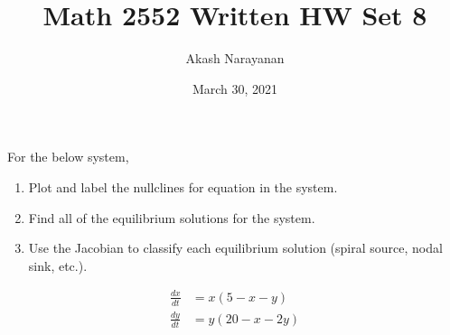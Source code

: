 \documentclass[11pt, titlepage]{article}
\title{Math 2552 Written HW Set 8}
\author{Akash Narayanan}
\date{March 30, 2021}
\begin{document}
    \maketitle

    \begin{problem}[Judson 5.1.3]
        For the below system,
        \begin{enumerate}[label=\alph*.]
            \item Plot and label the nullclines for equation in the system.
            \item Find all of the equilibrium solutions for the system.
            \item Use the Jacobian to classify each equilibrium solution (spiral
                source, nodal sink, etc.).
        \end{enumerate}
        \begin{align*}
            \frac{dx}{dt} &= x(5-x-y) \\
            \frac{dy}{dt} &= y(20-x-2y)
        \end{align*}
    \end{problem}
\end{document}
